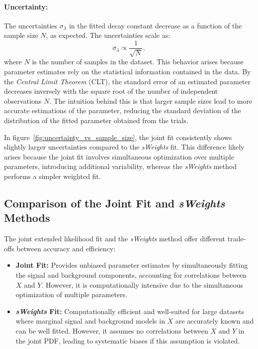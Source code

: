 \documentclass[11pt, a4paper]{article}
\begin{document}
\paragraph{Uncertainty:}  
The uncertainties \(\sigma_{\lambda}\) in the fitted decay constant decrease as a function of the sample size \( N \), as expected. The uncertainties scale as:
\[
\sigma_{\lambda} \propto \frac{1}{\sqrt{N}},
\]
where \( N \) is the number of samples in the dataset. This behavior arises because parameter estimates rely on the statistical information contained in the data. By the \textit{Central Limit Theorem} (CLT), the standard error of an estimated parameter decreases inversely with the square root of the number of independent observations \( N \). The intuition behind this is that larger sample sizes lead to more accurate estimations of the parameter, reducing the standard deviation of the distribution of the fitted parameter obtained from the trials.

In figure~\ref{fig:uncertainty_vs_sample_size}, the joint fit consistently shows slightly larger uncertainties compared to the \textit{sWeights} fit. This difference likely arises because the joint fit involves simultaneous optimization over multiple parameters, introducing additional variability, whereas the \textit{sWeights} method performs a simpler weighted fit.
\subsection{Comparison of the Joint Fit and \textit{sWeights} Methods}

The joint extended likelihood fit and the \textit{sWeights} method offer different trade-offs between accuracy and efficiency:

\begin{itemize}
    \item \textbf{Joint Fit:} Provides unbiased parameter estimates by simultaneously fitting the signal and background components, accounting for correlations between \( X \) and \( Y \). However, it is computationally intensive due to the simultaneous optimization of multiple parameters.
    
    \item \textbf{\textit{sWeights} Fit:} Computationally efficient and well-suited for large datasets where marginal signal and background models in \( X \) are accurately known and can be well fitted. However, it assumes no correlations between \( X \) and \( Y \) in the joint PDF, leading to systematic biases if this assumption is violated.
\end{itemize}
\end{document}

